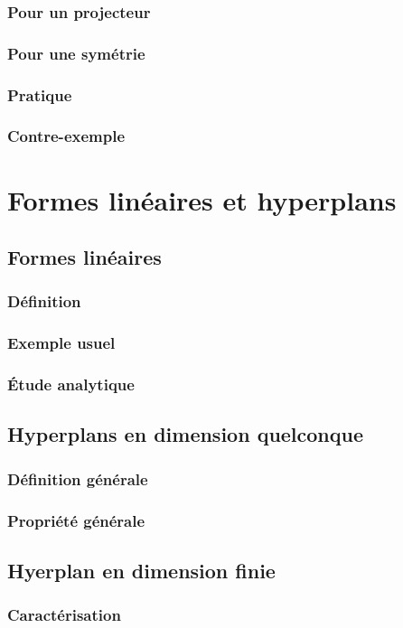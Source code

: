 \documentclass[12pt,a4paper,french]{book}
\begin{document}
			\subsubsection{Pour un projecteur}
			\subsubsection{Pour une symétrie}
			\subsubsection{Pratique}
			\subsubsection{Contre-exemple}	
	\section{Formes linéaires et hyperplans}
		\subsection{Formes linéaires}
			\subsubsection{Définition}
			\subsubsection{Exemple usuel}
			\subsubsection{Étude analytique}
		\subsection{Hyperplans en dimension quelconque}
			\subsubsection{Définition générale}
			\subsubsection{Propriété générale}
		\subsection{Hyerplan en dimension finie}
			\subsubsection{Caractérisation}
\end{document}
